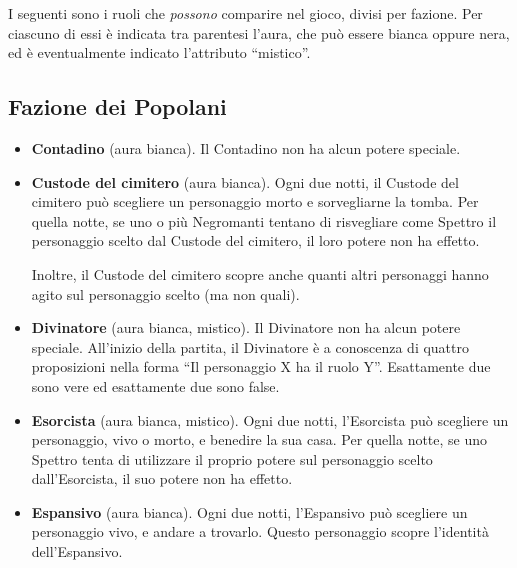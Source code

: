 \documentclass[a4paper,10pt]{article}
\begin{document}
I seguenti sono i ruoli che \emph{possono} comparire nel gioco, divisi per fazione. Per ciascuno di essi è indicata tra parentesi l'aura, che può essere bianca oppure nera, ed è eventualmente indicato l'attributo ``mistico''.

\subsection*{Fazione dei Popolani}

\begin{itemize}
	
	\item {\bf Contadino} (aura bianca). Il Contadino non ha alcun potere speciale.

 
	\item {\bf Custode del cimitero} (aura bianca). Ogni due notti, il Custode del cimitero può scegliere un personaggio morto e sorvegliarne la tomba. Per quella notte, se uno o più Negromanti tentano di risvegliare come Spettro il personaggio scelto dal Custode del cimitero, il loro potere non ha effetto.
  
	Inoltre, il Custode del cimitero scopre anche quanti altri personaggi hanno agito sul personaggio scelto (ma non quali).
	

	\item {\bf Divinatore} (aura bianca, mistico). Il Divinatore non ha alcun potere speciale. All'inizio della partita, il Divinatore è a conoscenza di quattro proposizioni nella forma ``Il personaggio X ha il ruolo Y''. Esattamente due sono vere ed esattamente due sono false.

	\item {\bf Esorcista} (aura bianca, mistico). Ogni due notti, l'Esorcista può scegliere un personaggio, vivo o morto, e benedire la sua casa. Per quella notte, se uno Spettro tenta di utilizzare il proprio potere sul personaggio scelto dall'Esorcista, il suo potere non ha effetto.

 
	\item {\bf Espansivo} (aura bianca). Ogni due notti, l'Espansivo può scegliere un personaggio vivo, e andare a trovarlo. Questo personaggio scopre l'identità dell'Espansivo.


\end{itemize}
\end{document}
